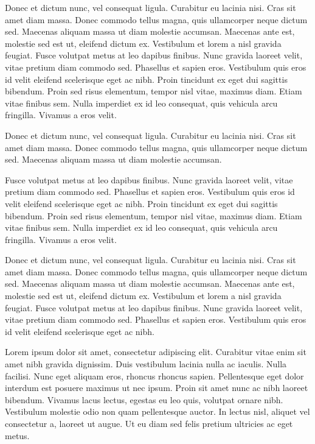 Donec et dictum nunc, vel consequat ligula. Curabitur eu lacinia nisi. Cras sit amet diam massa. Donec commodo tellus magna, quis ullamcorper neque dictum sed. Maecenas aliquam massa ut diam molestie accumsan. Maecenas ante est, molestie sed est ut, eleifend dictum ex. Vestibulum et lorem a nisl gravida feugiat. Fusce volutpat metus at leo dapibus finibus. Nunc gravida laoreet velit, vitae pretium diam commodo sed. Phasellus et sapien eros. Vestibulum quis eros id velit eleifend scelerisque eget ac nibh. Proin tincidunt ex eget dui sagittis bibendum. Proin sed risus elementum, tempor nisl vitae, maximus diam. Etiam vitae finibus sem. Nulla imperdiet ex id leo consequat, quis vehicula arcu fringilla. Vivamus a eros velit.


\begin{definition}
Donec et dictum nunc, vel consequat ligula. Curabitur eu lacinia nisi. Cras sit amet diam massa. Donec commodo tellus magna, quis ullamcorper neque dictum sed. Maecenas aliquam massa ut diam molestie accumsan. 
\end{definition}

\begin{definition}
Fusce volutpat metus at leo dapibus finibus. Nunc gravida laoreet velit, vitae pretium diam commodo sed. Phasellus et sapien eros. Vestibulum quis eros id velit eleifend scelerisque eget ac nibh. Proin tincidunt ex eget dui sagittis bibendum. Proin sed risus elementum, tempor nisl vitae, maximus diam. Etiam vitae finibus sem. Nulla imperdiet ex id leo consequat, quis vehicula arcu fringilla. Vivamus a eros velit.
\end{definition}

\begin{definition}[Vestibulum]
Donec et dictum nunc, vel consequat ligula. Curabitur eu lacinia nisi. Cras sit amet diam massa. Donec commodo tellus magna, quis ullamcorper neque dictum sed. Maecenas aliquam massa ut diam molestie accumsan. Maecenas ante est, molestie sed est ut, eleifend dictum ex. Vestibulum et lorem a nisl gravida feugiat. Fusce volutpat metus at leo dapibus finibus. Nunc gravida laoreet velit, vitae pretium diam commodo sed. Phasellus et sapien eros. Vestibulum quis eros id velit eleifend scelerisque eget ac nibh.	
\end{definition}

Lorem ipsum dolor sit amet, consectetur  adipiscing elit. Curabitur vitae enim sit amet nibh gravida dignissim. Duis vestibulum lacinia nulla ac iaculis. Nulla facilisi. Nunc eget aliquam eros, rhoncus rhoncus sapien. Pellentesque eget dolor interdum est posuere maximus ut nec ipsum. Proin sit amet nunc ac nibh laoreet bibendum. Vivamus lacus lectus, egestas eu leo quis, volutpat ornare nibh. Vestibulum molestie odio non quam pellentesque auctor. In lectus nisl, aliquet vel consectetur a, laoreet ut augue. Ut eu diam sed felis pretium ultricies ac eget metus.

